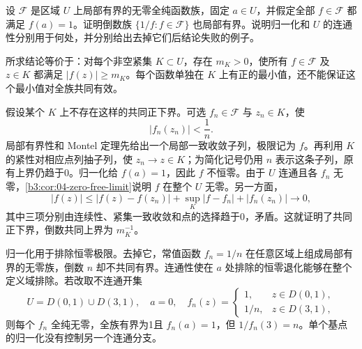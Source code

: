 \begin{exercise}\label{b3:ex:04-4}
设 \(\mathcal F\) 是区域 \(U\) 上局部有界的无零全纯函数族，固定 \(a\in U\)，并假定全部 \(f\in\mathcal F\) 都满足 \(f(a)=1\)。证明倒数族 \(\{1/f:f\in\mathcal F\}\) 也局部有界。说明归一化和 \(U\) 的连通性分别用于何处，并分别给出去掉它们后结论失败的例子。
\end{exercise}
\begin{solution}
所求结论等价于：对每个非空紧集 \(K\subset U\)，存在 \(m_K>0\)，使所有 \(f\in\mathcal F\) 及 \(z\in K\) 都满足 \(|f(z)|\ge m_K\)。每个函数单独在 \(K\) 上有正的最小值，还不能保证这个最小值对全族共同有效。

假设某个 \(K\) 上不存在这样的共同正下界。可选 \(f_n\in\mathcal F\) 与 \(z_n\in K\)，使
\[
 |f_n(z_n)|<\frac1n.
\]
局部有界性和 Montel 定理先给出一个局部一致收敛子列，极限记为 \(f\)。再利用 \(K\) 的紧性对相应点列抽子列，使 \(z_n\to z\in K\)；为简化记号仍用 \(n\) 表示这条子列，原有上界仍趋于0。归一化给 \(f(a)=1\)，因此 \(f\) 不恒零。由于 \(U\) 连通且各 \(f_n\) 无零，\cref{b3:cor:04-zero-free-limit}说明 \(f\) 在整个 \(U\) 无零。另一方面，
\[
 |f(z)|
 \le |f(z)-f(z_n)|
   +\sup_K|f-f_n|+|f_n(z_n)|
 \longrightarrow0,
\]
其中三项分别由连续性、紧集一致收敛和点的选择趋于0，矛盾。这就证明了共同正下界，倒数共同上界为 \(m_K^{-1}\)。

归一化用于排除恒零极限。去掉它，常值函数 \(f_n=1/n\) 在任意区域上组成局部有界的无零族，倒数 \(n\) 却不共同有界。连通性使在 \(a\) 处排除的恒零退化能够在整个定义域排除。若改取不连通开集
\[
 U=D(0,1)\cup D(3,1),\quad a=0,
 \quad
 f_n(z)=
 \begin{cases}
  1,&z\in D(0,1),\\
  1/n,&z\in D(3,1),
 \end{cases}
\]
则每个 \(f_n\) 全纯无零，全族有界为1且 \(f_n(a)=1\)，但 \(1/f_n(3)=n\)。单个基点的归一化没有控制另一个连通分支。
\end{solution}

